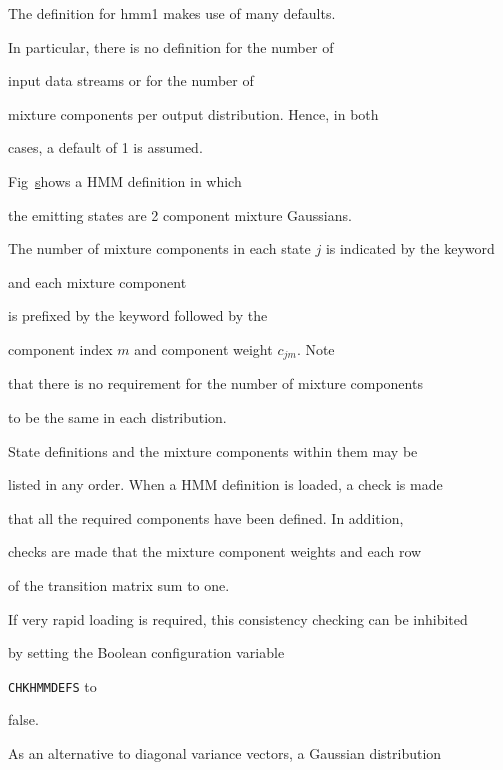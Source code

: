The definition for \textsf{hmm1} makes use of many defaults.


In particular, there is no definition for the number of


input data streams or for the number of 


mixture components per output distribution.  Hence, in both


cases, a default of 1 is assumed.





Fig~\href{f:hmm2def} shows a HMM definition in which


the emitting states are 2 component mixture Gaussians.


The number of mixture components in each state $j$ is indicated by the keyword


 and each mixture component 


is prefixed by the keyword   followed by the 


component index $m$ and component weight $c_{jm}$.  Note


that there is no requirement for the number of mixture components


to be the same in each distribution.








State definitions and the mixture components within them may be


listed in any order.  When a HMM definition is loaded, a check is made


that all the required components have been defined.  In addition,


checks are made that the mixture component weights and each row


of the transition matrix sum to one.


If very rapid loading is required, this consistency checking can be inhibited


by setting the Boolean configuration variable 


\texttt{CHKHMMDEFS} to


false.





As an alternative to diagonal variance vectors, a Gaussian distribution


